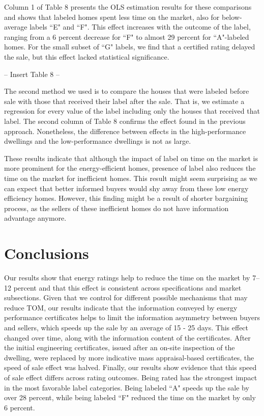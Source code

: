\documentclass[12pt]{article}
\begin{document}
Column 1 of Table 8 presents the OLS estimation results for these comparisons and shows that labeled homes spent less time on the market, also for below-average labels ``E" and ``F". This effect increases with the outcome of the label, ranging from a 6 percent decrease for ``F" to almost 29 percent for ``A"-labeled homes. For the small subset of ``G" labels, we find that a certified rating delayed the sale, but this effect lacked statistical significance. 

\begin{center}
-- Insert Table 8 --
\end{center}

The second method we used is to compare the houses that were labeled before sale with those that received their label after the sale. That is, we estimate a regression for every value of the label including only the houses that received that label. The second column of Table 8 confirms the effect found in the previous approach. Nonetheless, the difference between effects in the high-performance dwellings and the low-performance dwellings is not as large.

These results indicate that although the impact of label on time on the market is more prominent for the energy-efficient homes, presence of label also reduces the time on the market for inefficient homes. This result might seem surprising as we can expect that better informed buyers would shy away from these low energy efficiency homes. However, this finding might be a result of shorter bargaining process, as the sellers of these inefficient homes do not have information advantage anymore. 

\section{Conclusions}

Our results show that energy ratings help to reduce the time on the market by 7–12 percent and that this effect is consistent across specifications and market subsections. Given that we control for different possible mechanisms that may reduce TOM, our results indicate that the information conveyed by energy performance certificates helps to limit the information asymmetry between buyers and sellers, which speeds up the sale by an average of 15 - 25 days. This effect changed over time, along with the information content of the certificates. After the initial engineering certificates, issued after an on-site inspection of the dwelling, were replaced by more indicative mass appraisal-based certificates, the speed of sale effect was halved. Finally, our results show evidence that this speed of sale effect differs across rating outcomes. Being rated has the strongest impact in the most favorable label categories. Being labeled ``A" speeds up the sale by over 28 percent, while being labeled ``F" reduced the time on the market by only 6 percent. 
\end{document}
